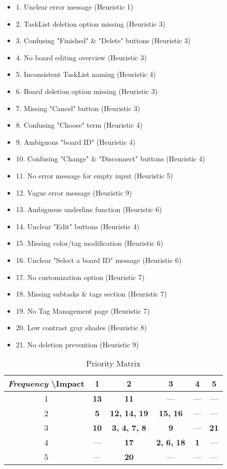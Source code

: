 \begin{itemize}
\item1.	Unclear error message (Heuristic 1)
\item2.	TaskList deletion option missing (Heuristic 3)
\item3.	Confusing "Finished" \& "Delete" buttons (Heuristic 3)
\item4.	No board editing overview (Heuristic 3)
\item5.	Inconsistent TaskList naming (Heuristic 4)
\item6.	Board deletion option missing (Heuristic 3)
\item7.	Missing "Cancel" button (Heuristic 3)
\item8.	Confusing "Choose" term (Heuristic 4)
\item9.	Ambiguous "board ID" (Heuristic 4)
\item10.	Confusing "Change" \& "Disconnect" buttons (Heuristic 4)
\item11.	No error message for empty input (Heuristic 5)
\item12.	Vague error message (Heuristic 9)
\item13.	Ambiguous underline function (Heuristic 6)
\item14.	Unclear "Edit" buttons (Heuristic 4)
\item15.	Missing color/tag modification (Heuristic 6)
\item16.	Unclear "Select a board ID" message (Heuristic 6)
\item17.	No customization option (Heuristic 7)
\item18.	Missing subtasks \& tags section (Heuristic 7)
\item19.	No Tag Management page (Heuristic 7)
\item20.	Low contrast gray shades (Heuristic 8)
\item21.	No deletion prevention (Heuristic 9)
\end{itemize}
\begin{table}[h!]
\centering
\caption{Priority Matrix}
\begin{tabular}{|c|c|c|c|c|c|}
\hline 
\textit{Frequency} \backslash Impact & 1 & 2 & 3 & 4 & 5   \\ \hline
1 & \textbf{13} & \textbf{11} & --- & --- & ---   \\ \hline
2 & \textbf{5} & \textbf{12,} \textbf{14,} \textbf{19} & \textbf{15,} \textbf{16} & --- & ---   \\ \hline
3 & \textbf{10} & \textbf{3,} \textbf{4,} \textbf{7,} \textbf{8} & \textbf{9} & --- & \textbf{21}    \\ \hline
4 & --- & \textbf{17} & \textbf{2,} \textbf{6,} \textbf{18} & \textbf{1} & ---   \\ \hline
5 & --- & \textbf{20} & --- & --- & ---   \\ \hline

\end{tabular}
\end{table}